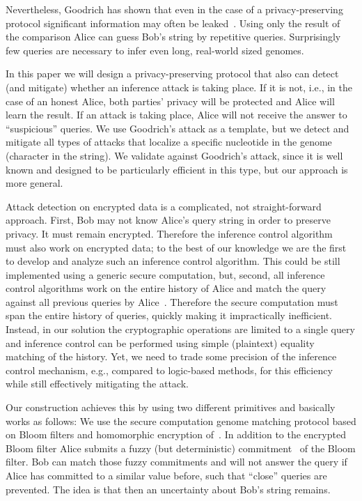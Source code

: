 \documentclass{llncs}
\begin{document}
Nevertheless, Goodrich has shown that even in the case of a privacy-preserving protocol significant information may often be leaked~\cite{Goo09}.
Using only the result of the comparison Alice can guess Bob's string by repetitive queries.
Surprisingly few queries are necessary to infer even long, real-world sized genomes.

In this paper we will design a privacy-preserving protocol that also can detect (and mitigate) whether an inference attack is taking place.
If it is not, i.e., in the case of an honest Alice, both parties' privacy will be protected and Alice will learn the result.
If an attack is taking place, Alice will not receive the answer to ``suspicious'' queries.
We use Goodrich's attack as a template, but we detect and mitigate all types of attacks that localize a specific nucleotide in the genome (character in the string).
We validate against Goodrich's attack, since it is well known and designed to be particularly efficient in this type, but our approach is more general.

Attack detection on encrypted data is a complicated, not straight-forward approach.
First, Bob may not know Alice's query string in order to preserve privacy.
It must remain encrypted.
Therefore the inference control algorithm must also work on encrypted data; to the best of our knowledge we are the first to develop and analyze such an inference control algorithm.
This could be still implemented using a generic secure computation, but, second, all inference control algorithms work on the entire history of Alice and match the query against all previous queries by Alice~\cite{Dom08}.
Therefore the secure computation must span the entire history of queries, quickly making it impractically inefficient.
Instead, in our solution the cryptographic operations are limited to a single query and inference control can be performed using simple (plaintext) equality matching of the history.
Yet, we need to trade some precision of the inference control mechanism, e.g., compared to logic-based methods, for this efficiency while still effectively mitigating the attack.

Our construction achieves this by using two different primitives and basically works as follows:
We use the secure computation genome matching protocol based on Bloom filters and homomorphic encryption of~\cite{BecKer12}.
In addition to the encrypted Bloom filter Alice submits a fuzzy (but deterministic) commitment~\cite{JueWat99} of the Bloom filter.
Bob can match those fuzzy commitments and will not answer the query if Alice has committed to a similar value before, such that ``close'' queries are prevented.
The idea is that then an uncertainty about Bob's string remains.
\end{document}
